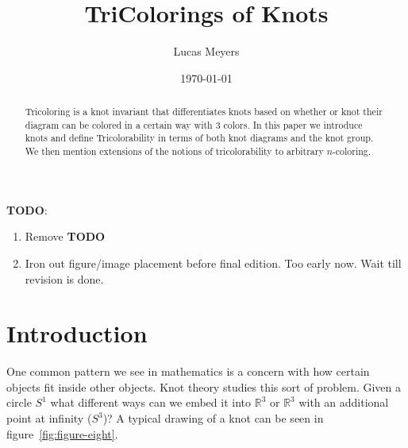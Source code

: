 \documentclass[12pt]{amsart}
\theoremstyle{definition}
\theoremstyle{remark}
\numberwithin{equation}{section}
\newcommand{\bb}[1]{\mathbb{#1}}
\begin{document}
\title{TriColorings of Knots}


\author{Lucas Meyers}
\address{Mathematics Department\\
Louisiana State University\\
Baton Rouge, Louisiana}

\date{\today}

\begin{abstract}
  Tricoloring is a knot invariant that differentiates knots
  based on whether or knot their diagram can be colored in a
  certain way with 3 colors. In this paper we introduce knots
  and define Tricolorability in terms of both knot diagrams
  and the knot group. We then mention extensions of the notions
  of tricolorability to arbitrary $n$-coloring.
\end{abstract}

\maketitle
\textbf{TODO}:
\begin{enumerate}
\item Remove \textbf{TODO}
\item Iron out figure/image placement before final edition. Too early
  now. Wait till revision is done.
\end{enumerate}

\section{Introduction}
\label{introduction}

One common pattern we see in mathematics is a concern with how
certain objects fit inside other objects. Knot theory studies this
sort of problem. Given a circle $S^1$ what different ways can we embed
it into $\bb{R}^3$ or $\bb{R}^3$  with an additional point at infinity ($S^3$)?
A typical drawing of a knot can be seen in figure~\ref{fig:figure-eight}.
\end{document}
